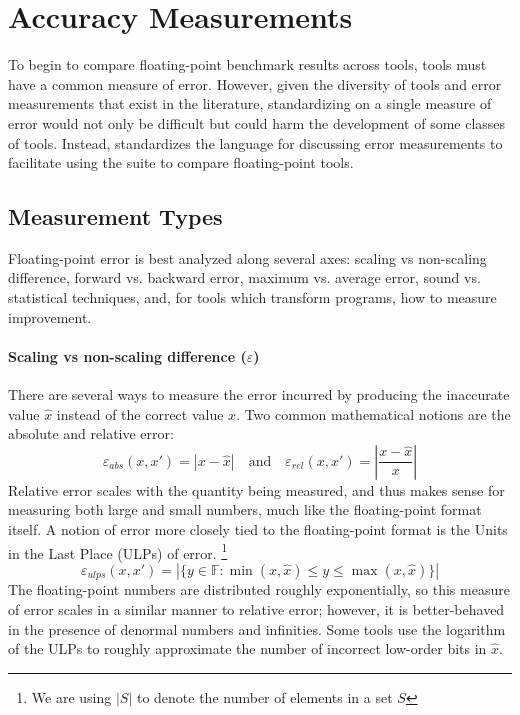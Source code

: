 \documentclass[main.tex]{subfiles}
\begin{document}
\section{Accuracy Measurements}
\label{sec:measure}

To begin to compare
  floating-point benchmark results across tools,
  tools must have a common measure of error.
However, given the diversity of tools and error measurements
  that exist in the literature,
  standardizing on a single measure of error
  would not only be difficult but could harm the development
  of some classes of tools.
Instead, \name standardizes the language
  for discussing error measurements
  to facilitate using the \name suite to compare floating-point tools.

\subsection{Measurement Types}

Floating-point error is best analyzed along several axes:
  scaling vs non-scaling difference, forward vs. backward error,
  maximum vs. average error, sound vs. statistical techniques,
  and, for tools which transform programs,
  how to measure improvement.

\paragraph{Scaling vs non-scaling difference ($\varepsilon$)}

There are several ways to measure the error incurred
  by producing the inaccurate value $\hat x$ instead of the correct value $x$.
Two common mathematical notions are the absolute and relative error:
\begin{equation*}
  \varepsilon_{abs}(x, x') = \left|x - \hat x\right|
  \quad \text{and} \quad
  \varepsilon_{rel}(x, x') = \left|\frac{x - \hat x}{x}\right|
\end{equation*}
Relative error scales with the quantity being measured,
  and thus makes sense for measuring both large and small numbers,
  much like the floating-point format itself.
A notion of error more closely tied to the floating-point format
  is the Units in the Last Place (ULPs) of error.%
\footnote{We are using $|S|$ to denote the number of elements in a set $S$}
\[
\varepsilon_{ulps}(x, x') = |\{ y \in \mathbb{F} : \min(x, \hat x) \le y \le \max(x, \hat x)
\}|
\]
The floating-point numbers are distributed roughly exponentially, so
this measure of error scales in a similar manner to relative
error; however, it is better-behaved in the presence of denormal
numbers and infinities.
Some tools use the logarithm of the ULPs to roughly approximate
the number of incorrect low-order bits in $\hat x$.
\end{document}
